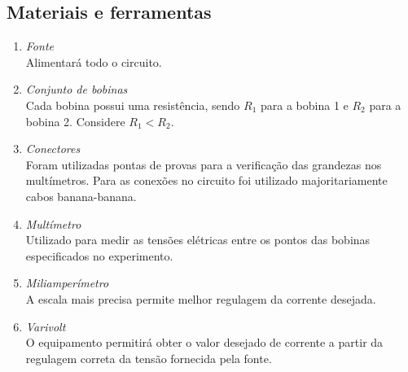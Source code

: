 \documentclass[a4paper,12pt,oneside,openany,table,xcdraw]{article}
\begin{document}
\subsection{Materiais e ferramentas} %
\begin{enumerate}[1 - ]
\item \emph{Fonte}\\
Alimentará todo o circuito.

\item \emph{Conjunto de bobinas}\\
Cada bobina possui uma resistência, sendo $R_1$ para a bobina 1 e $R_2$ para a bobina 2. Considere $R_1<R_2$.

\item \emph{Conectores}\\
Foram utilizadas pontas de provas para a verificação das grandezas nos multímetros. Para as conexões no circuito foi utilizado majoritariamente cabos banana-banana.

\item \emph{Multímetro}\\
Utilizado para medir as tensões elétricas entre os pontos das bobinas especificados no experimento.

\item \emph{Miliamperímetro}\\
A escala mais precisa permite melhor regulagem da corrente desejada.

\item \emph{Varivolt}\\
O equipamento permitirá obter o valor desejado de corrente a partir da regulagem correta da tensão fornecida pela fonte.


\end{enumerate}
\end{document}
